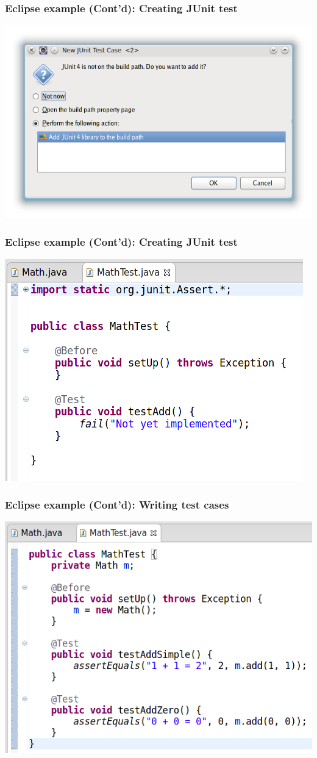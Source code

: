 \documentclass{beamer}
\begin{document}
\begin{frame}
\frametitle{Eclipse example (Cont'd): Creating JUnit test}
\label{sec-15}

\includegraphics[width=\textwidth]{./eclipse-junit-04-build-path.png}
\end{frame}
\begin{frame}
\frametitle{Eclipse example (Cont'd): Creating JUnit test}
\label{sec-16}

\includegraphics[width=.75\textwidth]{./eclipse-junit-05-test-stub.png}
\end{frame}
\begin{frame}
\frametitle{Eclipse example (Cont'd): Writing test cases}
\label{sec-17}

\includegraphics[width=.75\textwidth]{./eclipse-junit-06-test-code.png}
\end{frame}
\end{document}
